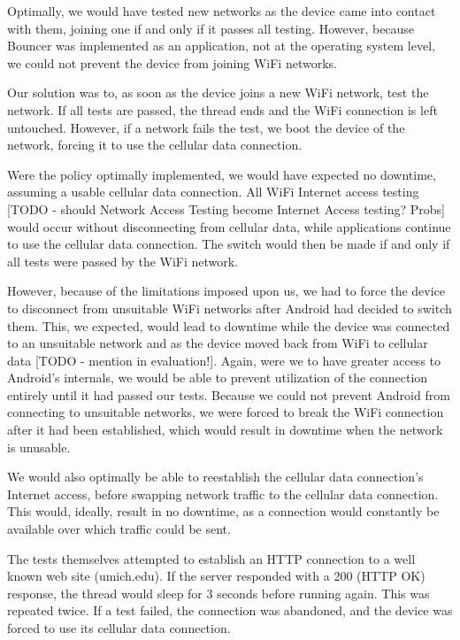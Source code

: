 Optimally, we would have tested new networks as the device came into contact with them, joining one if and only if it passes all testing. However, because Bouncer was implemented as an application, not at the operating system level, we could not prevent the device from joining WiFi networks.

Our solution was to, as soon as the device joins a new WiFi network, test the network. If all tests are passed, the thread ends and the WiFi connection is left untouched. However, if a network fails the test, we boot the device of the network, forcing it to use the cellular data connection.

Were the policy optimally implemented, we would have expected no downtime, assuming a usable cellular data connection. All WiFi Internet access testing [TODO - should Network Access Testing become Internet Access testing? Probs] would occur without disconnecting from cellular data, while applications continue to use the cellular data connection. The switch would then be made if and only if all tests were passed by the WiFi network.

However, because of the limitations imposed upon us, we had to force the device to disconnect from unsuitable WiFi networks after Android had decided to switch them. This, we expected, would lead to downtime while the device was connected to an unsuitable network and as the device moved back from WiFi to cellular data [TODO - mention in evaluation!]. Again, were we to have greater access to Android's internals, we would be able to prevent utilization of the connection entirely until it had passed our tests. Because we could not prevent Android from connecting to unsuitable networks, we were forced to break the WiFi connection after it had been established, which would result in downtime when the network is unusable.

We would also optimally be able to reestablish the cellular data connection's Internet access, before swapping network traffic to the cellular data connection. This would, ideally, result in no downtime, as a connection would constantly be available over which traffic could be sent.

The tests themselves attempted to establish an HTTP connection to a well known web site (umich.edu). If the server responded with a 200 (HTTP OK) response, the thread would sleep for 3 seconds before running again. This was repeated twice. If a test failed, the connection was abandoned, and the device was forced to use its cellular data connection.

